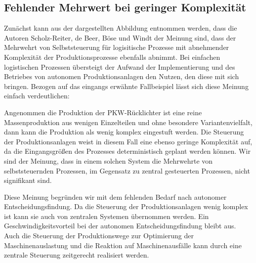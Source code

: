 \subsection{Fehlender Mehrwert bei geringer Komplexität}
\label{sec:GrenzenKomplexitaet}

Zunächst kann aus der dargestellten Abbildung entnommen werden, dass die Autoren
Scholz-Reiter, de Beer, Böse und Windt der Meinung sind, dass der Mehrwehrt von
Selbststeuerung für logisitische Prozesse mit abnehmender Komplexität der
Produktionsprozesse ebenfalls abnimmt. Bei einfachen logistischen Prozessen
übersteigt der Aufwand der Implementierung und des Betriebes von autonomen
Produktionsanlagen den Nutzen, den diese mit sich bringen. Bezogen auf das
eingangs erwähnte Fallbeispiel lässt sich diese Meinung einfach verdeutlichen:

Angenommen die Produktion der PKW-Rücklichter ist eine reine Massenproduktion
aus wenigen Einzelteilen und ohne besondere Variantenvielfalt, dann kann die
Produktion als wenig komplex eingestuft werden. Die Steuerung der
Produktionsanlagen weist in diesem Fall eine ebenso geringe Komplexität auf, da
die Eingangsgrößen des Prozesses deterministisch geplant werden können. Wir sind
der Meinung, dass in einem solchen System die Mehrwehrte von selbststeuernden
Prozessen, im Gegensatz zu zentral gesteuerten Prozessen, nicht signifikant
sind.

Diese Meinung begründen wir mit dem fehlenden Bedarf nach autonomer
Entscheidungsfindung. Da die Steuerung der Produktionsanlagen wenig komplex ist
kann sie auch von zentralen Systemen übernommen werden. Ein
Geschwindigkeitsvorteil bei der autonomen Entscheidungsfindung bleibt aus. Auch
die Steuerung der Produktionswege zur Optimierung der Maschinenauslastung und
die Reaktion auf Maschinenausfälle kann durch eine zentrale Steuerung
zeitgerecht realisiert werden.
